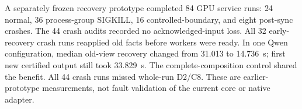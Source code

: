 A separately frozen recovery prototype completed 84 GPU service runs:
24 normal, 36 process-group SIGKILL, 16 controlled-boundary, and eight
post-sync crashes. The 44 crash audits recorded no acknowledged-input loss.
All 32 early-recovery crash runs reapplied old facts before workers were
ready. In one Qwen configuration, median old-view recovery changed from
31.013 to 14.736~s; first new certified output still took 33.829~s.
The complete-composition control shared the benefit. All 44 crash runs
missed whole-run D2/C8. These are earlier-prototype measurements, not fault
validation of the current core or native adapter.
